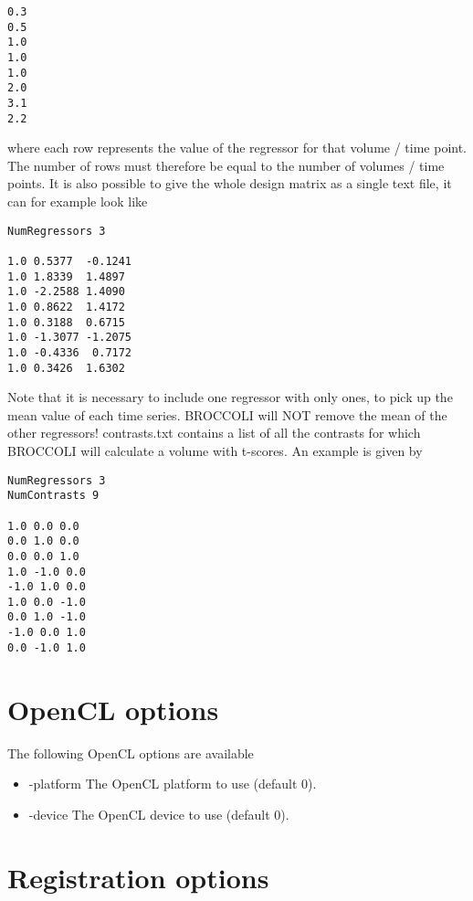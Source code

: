 \begin{verbatim}
0.3
0.5
1.0
1.0
1.0
2.0
3.1
2.2
\end{verbatim}
where each row represents the value of the regressor for that volume / time point. The number of rows must therefore be equal to the number of volumes / time points. It is also possible to give the whole design matrix as a single text file, it can for example look like
\begin{verbatim}
NumRegressors 3

1.0 0.5377  -0.1241	
1.0 1.8339  1.4897
1.0 -2.2588 1.4090
1.0 0.8622  1.4172
1.0 0.3188  0.6715
1.0 -1.3077 -1.2075	
1.0 -0.4336  0.7172
1.0 0.3426  1.6302
\end{verbatim}
Note that it is necessary to include one regressor with only ones, to pick up the mean value of each time series. BROCCOLI will NOT remove the mean of the other regressors! \newline \newline contrasts.txt contains a list of all the contrasts for which BROCCOLI will calculate a volume with t-scores. An example is given by

\begin{verbatim}
NumRegressors 3
NumContrasts 9

1.0 0.0 0.0
0.0 1.0 0.0
0.0 0.0 1.0
1.0 -1.0 0.0
-1.0 1.0 0.0
1.0 0.0 -1.0
0.0 1.0 -1.0
-1.0 0.0 1.0
0.0 -1.0 1.0
\end{verbatim}

\section{OpenCL options}

The following OpenCL options are available

\begin{itemize}

\item -platform
\newline \newline The OpenCL platform to use (default 0).

\item -device
\newline \newline The OpenCL device to use (default 0).

\end{itemize}

\section{Registration options}

